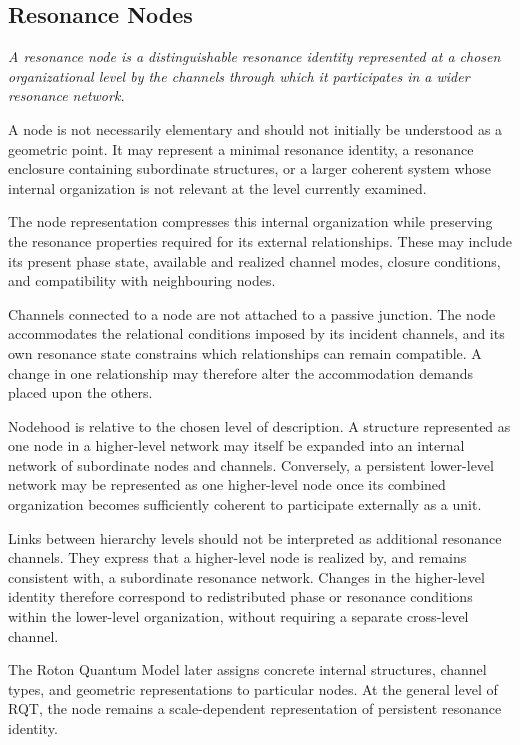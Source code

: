 \documentclass[11pt,a4paper]{article}
\begin{document}
\subsection{Resonance Nodes}

\emph{A resonance node is a distinguishable resonance identity represented at a chosen organizational level by the channels through which it participates in a wider resonance network.}
\vspace{0.6em}

A node is not necessarily elementary and should not initially be understood as a geometric point. It may represent a minimal resonance identity, a resonance enclosure containing subordinate structures, or a larger coherent system whose internal organization is not relevant at the level currently examined.

The node representation compresses this internal organization while preserving the resonance properties required for its external relationships. These may include its present phase state, available and realized channel modes, closure conditions, and compatibility with neighbouring nodes.

Channels connected to a node are not attached to a passive junction. The node accommodates the relational conditions imposed by its incident channels, and its own resonance state constrains which relationships can remain compatible. A change in one relationship may therefore alter the accommodation demands placed upon the others.

Nodehood is relative to the chosen level of description. A structure represented as one node in a higher-level network may itself be expanded into an internal network of subordinate nodes and channels. Conversely, a persistent lower-level network may be represented as one higher-level node once its combined organization becomes sufficiently coherent to participate externally as a unit.

Links between hierarchy levels should not be interpreted as additional resonance channels. They express that a higher-level node is realized by, and remains consistent with, a subordinate resonance network. Changes in the higher-level identity therefore correspond to redistributed phase or resonance conditions within the lower-level organization, without requiring a separate cross-level channel.

The Roton Quantum Model later assigns concrete internal structures, channel types, and geometric representations to particular nodes. At the general level of RQT, the node remains a scale-dependent representation of persistent resonance identity.
\end{document}
